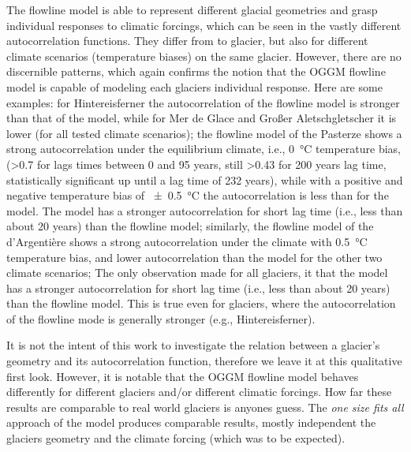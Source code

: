       The flowline model is able to represent different glacial geometries and grasp individual responses to climatic forcings, which can be seen in the vastly different autocorrelation functions. They differ from to glacier, but also for different climate scenarios (temperature biases) on the same glacier. However, there are no discernible patterns, which again confirms the notion that the OGGM flowline model is capable of modeling each glaciers individual response. Here are some examples: for Hintereisferner the autocorrelation of the flowline model is stronger than that of the \vas{} model, while for Mer de Glace and Großer Aletschgletscher it is lower (for all tested climate scenarios); the flowline model of the Pasterze shows a strong autocorrelation under the equilibrium climate, i.e., \SI{0}{\celsius} temperature bias, (>0.7 for lags times between 0 and 95 years, still >0.43 for 200 years lag time, statistically significant up until a lag time of 232 years), while with a positive and negative temperature bias of \SI{\pm0.5}{\celsius} the autocorrelation is less than for the \vas{} model.
      The \vas{} model has a stronger autocorrelation for short lag time (i.e., less than about 20 years) than the flowline model; similarly, the flowline model of the d'Argentière shows a strong autocorrelation under the climate with \SI{+0.5}{\celsius} temperature bias, and lower autocorrelation than the \vas{} model for the other two climate scenarios; The only observation made for all glaciers, it that the \vas{} model has a stronger autocorrelation for short lag time (i.e., less than about 20 years) than the flowline model. This is true even for glaciers, where the autocorrelation of the flowline mode is generally stronger (e.g., Hintereisferner). 

      It is not the intent of this work to investigate the relation between a glacier's geometry and its autocorrelation function, therefore we leave it at this qualitative first look. However, it is notable that the OGGM flowline model behaves differently for different glaciers and/or different climatic forcings. How far these results are comparable to real world glaciers is anyones guess. The \textit{one size fits all} approach of the \vas{} model produces comparable results, mostly independent the glaciers geometry and the climate forcing (which was to be expected).


